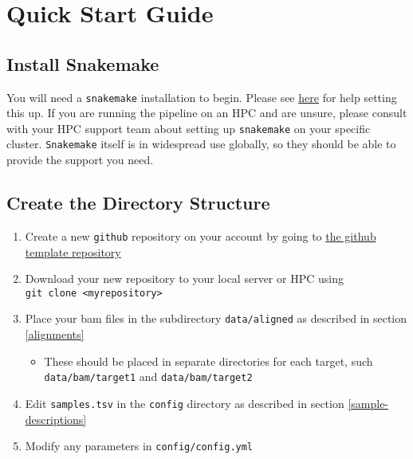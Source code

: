 \documentclass[
]{book}
\providecommand{\tightlist}{%
  \setlength{\itemsep}{0pt}\setlength{\parskip}{0pt}}
\begin{document}
\hypertarget{quick-start}{%
\chapter{Quick Start Guide}\label{quick-start}}

\hypertarget{snakemake}{%
\section{Install Snakemake}\label{snakemake}}

You will need a \texttt{snakemake} installation to begin.
Please see \href{https://snakemake.readthedocs.io/en/stable/getting_started/installation.html}{here} for help setting this up.
If you are running the pipeline on an HPC and are unsure, please consult with your HPC support team about setting up \texttt{snakemake} on your specific cluster.
\texttt{Snakemake} itself is in widespread use globally, so they should be able to provide the support you need.

\hypertarget{quick-directories}{%
\section{Create the Directory Structure}\label{quick-directories}}

\begin{enumerate}
\def\labelenumi{\arabic{enumi}.}
\tightlist
\item
  Create a new \texttt{github} repository on your account by going to \href{https://github.com/steveped/GRAVI/generate}{the github template repository}
\item
  Download your new repository to your local server or HPC using \texttt{git\ clone\ \textless{}myrepository\textgreater{}}
\item
  Place your bam files in the subdirectory \texttt{data/aligned} as described in section \ref{alignments}

  \begin{itemize}
  \tightlist
  \item
    These should be placed in separate directories for each target, such \texttt{data/bam/target1} and \texttt{data/bam/target2}
  \end{itemize}
\item
  Edit \texttt{samples.tsv} in the \texttt{config} directory as described in section \ref{sample-descriptions}
\item
  Modify any parameters in \texttt{config/config.yml}
\end{enumerate}
\end{document}
